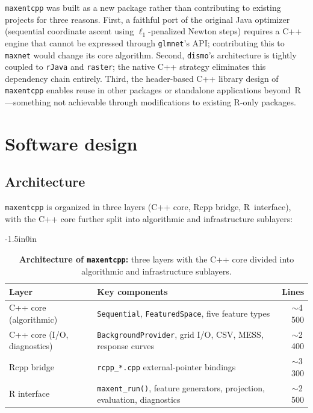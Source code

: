 \documentclass[10pt,letterpaper]{article}
\begin{document}
\texttt{maxentcpp} was built as a new package rather than contributing
to existing projects for three reasons.
First, a faithful port of the original Java optimizer (sequential
coordinate ascent using $\ell_1$-penalized Newton steps) requires a C++
engine that cannot be expressed through \texttt{glmnet}'s API;
contributing this to \texttt{maxnet} would change its core algorithm.
Second, \texttt{dismo}'s architecture is tightly coupled to
\texttt{rJava} and \texttt{raster}; the native C++ strategy eliminates
this dependency chain entirely.
Third, the header-based C++ library design of \texttt{maxentcpp} enables
reuse in other packages or standalone applications beyond~R---something
not achievable through modifications to existing R-only packages.

\section*{Software design}

\subsection*{Architecture}

\texttt{maxentcpp} is organized in three layers (C++ core, Rcpp bridge,
R~interface), with the C++ core further split into algorithmic and
infrastructure sublayers:

\begin{table}[!ht]
\begin{adjustwidth}{-1.5in}{0in}
\centering
\caption{{\bf Architecture of \texttt{maxentcpp}:} three layers with the
         C++ core divided into algorithmic and infrastructure sublayers.}
\begin{tabular}{|l|l|r|}
\hline
\textbf{Layer} & \textbf{Key components} & \textbf{Lines} \\
\hline
C++ core (algorithmic)
  & \texttt{Sequential}, \texttt{FeaturedSpace}, five feature types
  & $\sim$4\,500 \\
\hline
C++ core (I/O, diagnostics)
  & \texttt{BackgroundProvider}, grid I/O, CSV, MESS, response curves
  & $\sim$2\,400 \\
\hline
Rcpp bridge
  & \texttt{rcpp\_*.cpp} external-pointer bindings~\cite{Eddelbuettel2013}
  & $\sim$3\,300 \\
\hline
R interface
  & \texttt{maxent\_run()}, feature generators, projection, evaluation,
    diagnostics
  & $\sim$2\,500 \\
\hline
\end{tabular}
\label{tab:arch}
\end{adjustwidth}
\end{table}
\end{document}
